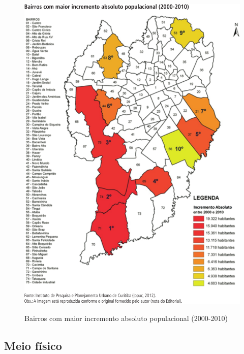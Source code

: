 	\begin{figure}
		\centering
		\caption{Bairros com maior incremento absoluto populacional (2000-2010)}
		\includegraphics[width=1.0\linewidth]{img/costa2015a_04}
		\label{fig:costa2015a_04}
	\end{figure}
    
	\subsection{Meio físico}
	
